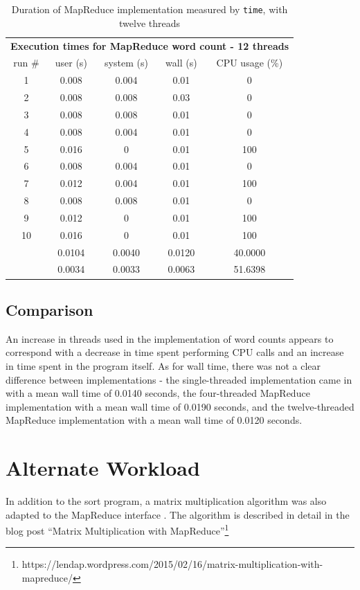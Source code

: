 \documentclass[12pt, letterpaper]{article}
\begin{document}
	\begin{table}[h]
	\centering
	\begin{tabular}{ccccc}
	\multicolumn{5}{c}{\cellcolor[HTML]{FFFFC7}\textbf{Execution times for MapReduce word count - 12 threads}} \\
	\rowcolor[HTML]{EFEFEF} 
	run \# & user (s) & system (s) & wall (s) & CPU usage (\%) \\
	1 & 0.008 & 0.004 & 0.01 & 0 \\
	2 & 0.008 & 0.008 & 0.03 & 0 \\
	3 & 0.008 & 0.008 & 0.01 & 0 \\
	4 & 0.008 & 0.004 & 0.01 & 0 \\
	5 & 0.016 & 0 & 0.01 & 100 \\
	6 & 0.008 & 0.004 & 0.01 & 0 \\
	7 & 0.012 & 0.004 & 0.01 & 100 \\
	8 & 0.008 & 0.008 & 0.01 & 0 \\
	9 & 0.012 & 0 & 0.01 & 100 \\
	10 & 0.016 & 0 & 0.01 & 100 \\
	\rowcolor[HTML]{D0F0D0} 
	\multicolumn{1}{r}{\cellcolor[HTML]{9AFF99}mean (s)} & 0.0104 & 0.0040 & 0.0120 & 40.0000 \\
	\rowcolor[HTML]{ECF4FF} 
	\multicolumn{1}{r}{\cellcolor[HTML]{DAE8FC}std. dev. (s)} & 0.0034 & 0.0033 & 0.0063 & 51.6398
	\end{tabular}
	\caption{Duration of MapReduce implementation measured by \texttt{time}, with twelve threads\label{table:MR12ImplWC}}
	\end{table}
\subsection{Comparison}
	An increase in threads used in the implementation of word counts appears to correspond with a decrease in time spent performing CPU calls and an increase in time spent in the program itself. As for wall time, there was not a clear difference between implementations - the single-threaded implementation came in with a mean wall time of 0.0140 seconds, the four-threaded MapReduce implementation with a mean wall time of 0.0190 seconds, and the twelve-threaded MapReduce implementation with a mean wall time of 0.0120 seconds.
	
\section{Alternate Workload}
In addition to the sort program, a matrix multiplication algorithm was also adapted to the MapReduce interface . The algorithm is described in detail in the blog post “Matrix Multiplication with MapReduce”\footnote{https://lendap.wordpress.com/2015/02/16/matrix-multiplication-with-mapreduce/}
\end{document}
